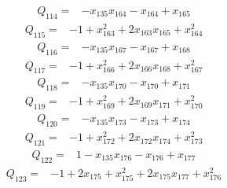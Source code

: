 \begin{equation*}\begin{aligned}
Q_{114}={}& -x_{135}x_{164}-x_{164}+x_{165}
\end{aligned}\end{equation*}
\begin{equation*}\begin{aligned}
Q_{115}={}& -1+x_{163}^{2}+2x_{163}x_{165}+x_{164}^{2}
\end{aligned}\end{equation*}
\begin{equation*}\begin{aligned}
Q_{116}={}& -x_{135}x_{167}-x_{167}+x_{168}
\end{aligned}\end{equation*}
\begin{equation*}\begin{aligned}
Q_{117}={}& -1+x_{166}^{2}+2x_{166}x_{168}+x_{167}^{2}
\end{aligned}\end{equation*}
\begin{equation*}\begin{aligned}
Q_{118}={}& -x_{135}x_{170}-x_{170}+x_{171}
\end{aligned}\end{equation*}
\begin{equation*}\begin{aligned}
Q_{119}={}& -1+x_{169}^{2}+2x_{169}x_{171}+x_{170}^{2}
\end{aligned}\end{equation*}
\begin{equation*}\begin{aligned}
Q_{120}={}& -x_{135}x_{173}-x_{173}+x_{174}
\end{aligned}\end{equation*}
\begin{equation*}\begin{aligned}
Q_{121}={}& -1+x_{172}^{2}+2x_{172}x_{174}+x_{173}^{2}
\end{aligned}\end{equation*}
\begin{equation*}\begin{aligned}
Q_{122}={}& 1-x_{135}x_{176}-x_{176}+x_{177}
\end{aligned}\end{equation*}
\begin{equation*}\begin{aligned}
Q_{123}={}& -1+2x_{175}+x_{175}^{2}+2x_{175}x_{177}+x_{176}^{2}
\end{aligned}\end{equation*}
